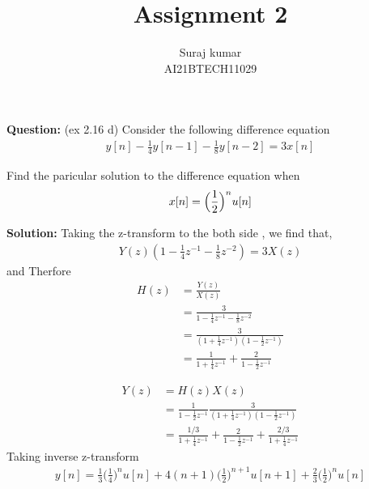 \documentclass[10pt,twocolumn]{IEEEtran}
\title{Assignment 2}
\author{Suraj kumar \\ \normalsize AI21BTECH11029}
\newcommand{\question}{\noindent \textbf{Question: }}
\newcommand{\solution}{\noindent \textbf{Solution: }}
\begin{document}
\maketitle
\question (ex 2.16 d) Consider the following difference
equation 
\begin{align}
    y[n]-\frac{1}{4}y[n-1]-\frac{1}{8}y[n-2]=3x[n]
\end{align}

Find the paricular solution to the difference equation when \begin{align*}
    x[n]=\Bigl(\frac{1}{2}\Bigr)^n u[n] 
\end{align*}

\solution Taking the z-transform to the both side , we find that,
\begin{align}
    Y(z)(1-\frac{1}{4}z^{-1}-\frac{1}{8}z^{-2})=3X(z)
\end{align}
and Therfore
\begin{align}
    H(z)&=\frac{Y(z)}{X(z)}\\
    &=\frac{3}{1-\frac{1}{4}z^{-1}-\frac{1}{8}z^{-2}}\\
    &=\frac{3}{(1+\frac{1}{4}z^{-1})(1-\frac{1}{2}z^{-1})}\\
    &=\frac{1}{1+\frac{1}{4}z^{-1}}+\frac{2}{1-\frac{1}{2}z^{-1}}
\end{align}

\begin{align}
    Y(z)&=H(z)X(z)\\
    &=\frac{1}{1-\frac{1}{2}z^{-1}}\frac{3}{(1+\frac{1}{4}z^{-1})(1-\frac{1}{2}z^{-1})}\\
    &=\frac{1/3}{1+\frac{1}{4}z^{-1}}+\frac{2}{1-\frac{1}{2}z^{-1}}+\frac{2/3}{1+\frac{1}{4}z^{-1}}
\end{align}
Taking inverse z-transform
\begin{align}
    y[n]=\frac{1}{3}\bigl(\frac{1}{4}\bigr)^{n}u[n]+4(n+1)\bigl(\frac{1}{2}\bigr)^{n+1}u[n+1]+\frac{2}{3}\bigl(\frac{1}{2}\bigr)^{n}u[n]
\end{align}
\end{document}
